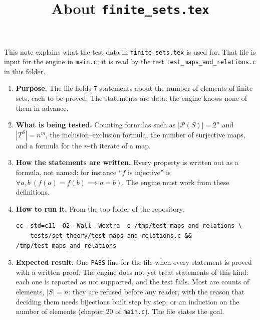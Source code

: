 \documentclass[11pt,a4paper]{article}
\title{About \texttt{finite\_sets.tex}}
\author{}
\date{}
\begin{document}
\maketitle
This note explains what the test data in \texttt{finite\_sets.tex} is used for. That file is input for the engine in \texttt{main.c}; it is read by the test \texttt{test\_maps\_and\_relations.c} in this folder.

\begin{enumerate}
\item \textbf{Purpose.} The file holds 7 statements about the number of elements of finite sets, each to be proved. The statements are data: the engine knows none of them in advance.

\item \textbf{What is being tested.} Counting formulas such as $|\mathcal{P}(S)| = 2^{n}$ and $|T^{S}| = n^{m}$, the inclusion--exclusion formula, the number of surjective maps, and a formula for the $n$-th iterate of a map.

\item \textbf{How the statements are written.} Every property is written out as a formula, not named: for instance ``$f$ is injective'' is $\forall a, b\ (f(a) = f(b) \implies a = b)$. The engine must work from these definitions.

\item \textbf{How to run it.} From the top folder of the repository:
\begin{verbatim}
cc -std=c11 -O2 -Wall -Wextra -o /tmp/test_maps_and_relations \
    tests/set_theory/test_maps_and_relations.c && /tmp/test_maps_and_relations
\end{verbatim}

\item \textbf{Expected result.} One \texttt{PASS} line for the file when every statement is proved with a written proof. The engine does not yet treat statements of this kind: each one is reported as not supported, and the test fails. Most are counts of elements, $|S| = n$: they are refused before any reader, with the reason that deciding them needs bijections built step by step, or an induction on the number of elements (chapter 20 of \texttt{main.c}). The file states the goal.
\end{enumerate}
\end{document}

